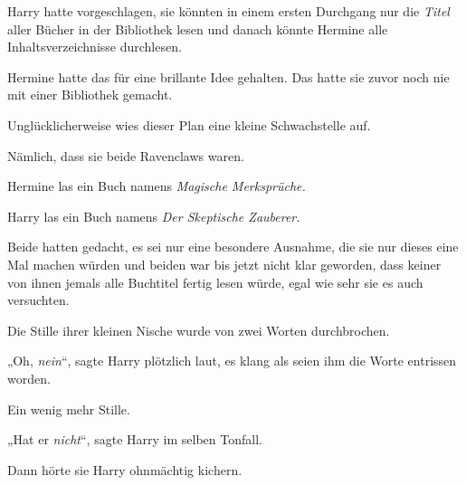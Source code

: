 Harry hatte vorgeschlagen, sie könnten in einem ersten Durchgang nur die \emph{Titel} aller Bücher in der Bibliothek lesen und danach könnte Hermine alle Inhaltsverzeichnisse durchlesen.

Hermine hatte das für eine brillante Idee gehalten. Das hatte sie zuvor noch nie mit einer Bibliothek gemacht.

Unglücklicherweise wies dieser Plan eine kleine Schwachstelle auf.

Nämlich, dass sie beide Ravenclaws waren.

Hermine las ein Buch namens \emph{Magische Merksprüche.}

Harry las ein Buch namens \emph{Der Skeptische Zauberer.}

Beide hatten gedacht, es sei nur eine besondere Ausnahme, die sie nur dieses eine Mal machen würden und beiden war bis jetzt nicht klar geworden, dass keiner von ihnen jemals alle Buchtitel fertig lesen würde, egal wie sehr sie es auch versuchten.

Die Stille ihrer kleinen Nische wurde von zwei Worten durchbrochen.

„Oh, \emph{nein}“, sagte Harry plötzlich laut, es klang als seien ihm die Worte entrissen worden.

Ein wenig mehr Stille.

„Hat er \emph{nicht}“, sagte Harry im selben Tonfall.

Dann hörte sie Harry ohnmächtig kichern.

